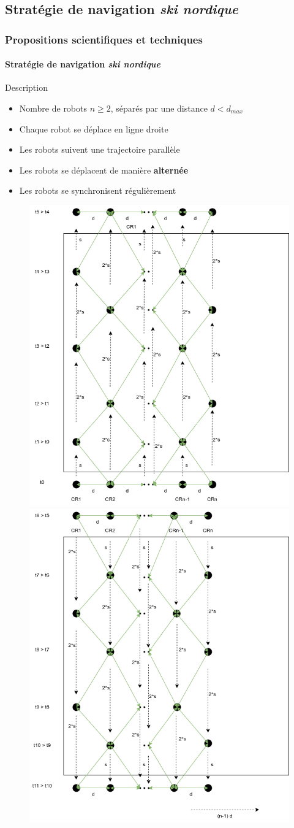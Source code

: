 \documentclass{beamer}
\newcommand{\compresslist}{\setlength{\itemsep}{0pt}\setlength{\parskip}{1pt}\setlength{\parsep}{0pt}}
\begin{document}
		\subsection{Stratégie de navigation \textit{ski nordique}}
			\begin{frame}
				\frametitle{Propositions scientifiques et techniques}
				\framesubtitle{Stratégie de navigation \textit{ski nordique}}
				\vspace{-5pt}
				\tiny
				\begin{block}{Description}
				\begin{itemize}\compresslist
						\item Nombre de robots $n \ge 2$, séparés par une distance $d < d_{max}$
						\item Chaque robot se déplace en ligne droite
						\item Les robots suivent une trajectoire parallèle
						\item Les robots se déplacent de manière \textbf{alternée}
						\item Les robots se synchronisent régulièrement
					\end{itemize}
				\end{block}
				\vspace{-5pt}
				\begin{figure}
					\centering
					\includegraphics[width=0.35\linewidth]{graphics/ski_nordique_1.png}
					\includegraphics[width=0.35\linewidth]{graphics/ski_nordique_2.png}
				\end{figure}
			\end{frame}
\end{document}
